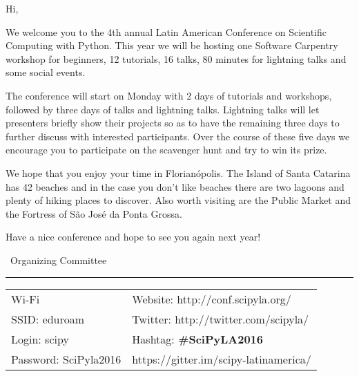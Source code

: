 Hi,

\vskip1cm

We welcome you to the 4th annual Latin American Conference on Scientific Computing with Python.
This year we will be hosting one Software Carpentry workshop for beginners,
12 tutorials, 16 talks, 80 minutes for lightning talks
and some social events.

The conference will start on Monday with 2 days of tutorials and workshops, followed by three days of talks and lightning talks. Lightning talks will let presenters briefly show their projects so as to have the remaining three days to further discuss with interested participants.
Over the course of these five days we encourage you to participate on the scavenger hunt
and try to win its prize.

We hope that you enjoy your time in Florianópolis.
The Island of Santa Catarina has 42 beaches
and in the case you don't like beaches there are two lagoons and plenty of hiking places to discover.
Also worth visiting are the Public Market and the Fortress of São José da Ponta Grossa.

Have a nice conference and hope to see you again next year!
\vskip1cm

\textemdash\ Organizing Committee

\vfill

\hrule

\begin{center}
       \begin{tabular}{p{4cm} p{7cm}}
     Wi-Fi & Website: http://conf.scipyla.org/ \\
     SSID: eduroam & Twitter: http://twitter.com/scipyla/ \\
     Login: scipy & Hashtag: \textbf{\#SciPyLA2016} \\
     Password: SciPyla2016 & https://gitter.im/scipy-latinamerica/
   \end{tabular}
\end{center}


